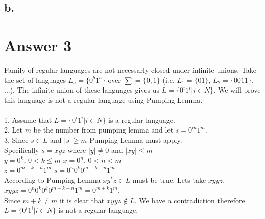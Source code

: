 \documentclass[12pt]{article}
\begin{document}
\subsection*{b.}
\section*{Answer 3}
\hspace{1.2cm}Family of regular languages are not necessarly closed under infinite unions. Take the set of languages $L_a=\lbrace 0^b1^a\rbrace$ over $\sum =\lbrace 0,1\rbrace$ (i.e. $L_1=\lbrace 01\rbrace$, $L_2=\lbrace 0011\rbrace$, ...).
The infinite union of these languages gives us $L=\lbrace 0^i1^i|i\in N\rbrace$. We will prove this language is not a regular language using Pumping Lemma.\\
\\
1. Assume that $L=\lbrace 0^i1^i|i\in N\rbrace$ is a regular language.\\
2. Let $m$ be the number from pumping lemma and let $s=0^m1^m$.\\
3. Since $s\in L$ and $|s|\geq m$ Pumping Lemma must apply.\\
Specifically $s=xyz$ where $|y|\neq 0$ and $|xy|\leq m$\\
$y=0^k$, $0<k\leq m$\hspace{1.3cm} $x=0^n$, $0<n<m$ \\$z=0^{m-k-n}1^m$\hspace{2cm} $s=0^n0^k0^{m-k-n}1^m$ \\
According to Pumping Lemma $xy^*z \in L$ must be true. Lets take $xyyz$.\\
$xyyz=0^n0^k0^k0^{m-k-n}1^m = 0^{m+k}1^m$.\\
Since $m+k\neq m$ it is clear that $xyyz\notin L$. We have a contradiction therefore $L=\lbrace 0^i1^i|i\in N\rbrace$ is not a regular language.\\
\end{document}
